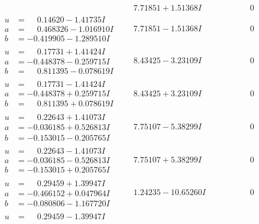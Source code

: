 \documentclass[1p]{elsarticle_modified}
\theoremstyle{definition}
\begin{document}
$$\begin{array}{c|c|c}
 & \phantom{-}7.71851 + 1.51368 I & \phantom{-0.000000 } 0 \\ \hline\begin{aligned}
u &= \phantom{-}0.14620 - 1.41735 I \\
a &= \phantom{-}0.468326 - 1.016910 I \\
b &= -0.419905 - 1.289510 I\end{aligned}
 & \phantom{-}7.71851 - 1.51368 I & \phantom{-0.000000 } 0 \\ \hline\begin{aligned}
u &= \phantom{-}0.17731 + 1.41424 I \\
a &= -0.448378 - 0.259715 I \\
b &= \phantom{-}0.811395 - 0.078619 I\end{aligned}
 & \phantom{-}8.43425 - 3.23109 I & \phantom{-0.000000 } 0 \\ \hline\begin{aligned}
u &= \phantom{-}0.17731 - 1.41424 I \\
a &= -0.448378 + 0.259715 I \\
b &= \phantom{-}0.811395 + 0.078619 I\end{aligned}
 & \phantom{-}8.43425 + 3.23109 I & \phantom{-0.000000 } 0 \\ \hline\begin{aligned}
u &= \phantom{-}0.22643 + 1.41073 I \\
a &= -0.036185 + 0.526813 I \\
b &= -0.153015 - 0.205765 I\end{aligned}
 & \phantom{-}7.75107 - 5.38299 I & \phantom{-0.000000 } 0 \\ \hline\begin{aligned}
u &= \phantom{-}0.22643 - 1.41073 I \\
a &= -0.036185 - 0.526813 I \\
b &= -0.153015 + 0.205765 I\end{aligned}
 & \phantom{-}7.75107 + 5.38299 I & \phantom{-0.000000 } 0 \\ \hline\begin{aligned}
u &= \phantom{-}0.29459 + 1.39947 I \\
a &= -0.466152 + 0.047964 I \\
b &= -0.080806 - 1.167720 I\end{aligned}
 & \phantom{-}1.24235 - 10.65260 I & \phantom{-0.000000 } 0 \\ \hline\begin{aligned}
u &= \phantom{-}0.29459 - 1.39947 I \\

\end{aligned}
\end{array}$$
\end{document}

